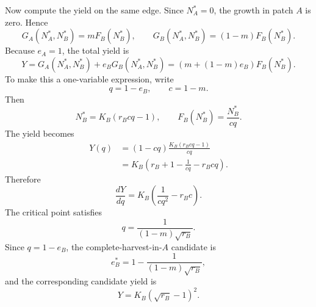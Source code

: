 \documentclass{article}
\numberwithin{equation}{section}
\begin{document}
Now compute the yield on the same edge. Since $N_A^*=0$, the growth in
patch $A$ is zero. Hence
\begin{equation*}
    G_A(N_A^*,N_B^*)=mF_B(N_B^*),
    \qquad
    G_B(N_A^*,N_B^*)=(1-m)F_B(N_B^*).
\end{equation*}
Because $e_A=1$, the total yield is
\begin{equation*}
    Y=
    G_A(N_A^*,N_B^*)+e_BG_B(N_A^*,N_B^*)
    =
    \left(m+(1-m)e_B\right)
    F_B(N_B^*).
\end{equation*}
To make this a one-variable expression, write
\begin{equation*}
    q=1-e_B,
    \qquad
    c=1-m.
\end{equation*}
Then
\begin{equation*}
    N_B^*=K_B(r_Bcq-1),
    \qquad
    F_B(N_B^*)=\frac{N_B^*}{cq}.
\end{equation*}
The yield becomes
\begin{align*}
    Y(q)
        &=
        \left(1-cq\right)
        \frac{K_B(r_Bcq-1)}{cq}\\
        &=
        K_B\left(r_B+1-\frac{1}{cq}-r_Bcq\right).
\end{align*}
Therefore
\begin{equation*}
    \frac{dY}{dq}
    =
    K_B\left(\frac{1}{cq^2}-r_Bc\right).
\end{equation*}
The critical point satisfies
\begin{equation*}
    q=\frac{1}{(1-m)\sqrt{r_B}}.
\end{equation*}
Since $q=1-e_B$, the complete-harvest-in-$A$ candidate is
\begin{equation*}
    e_B^*=1-\frac{1}{(1-m)\sqrt{r_B}},
\end{equation*}
and the corresponding candidate yield is
\begin{equation*}
    Y=K_B(\sqrt{r_B}-1)^2.
\end{equation*}
\end{document}
